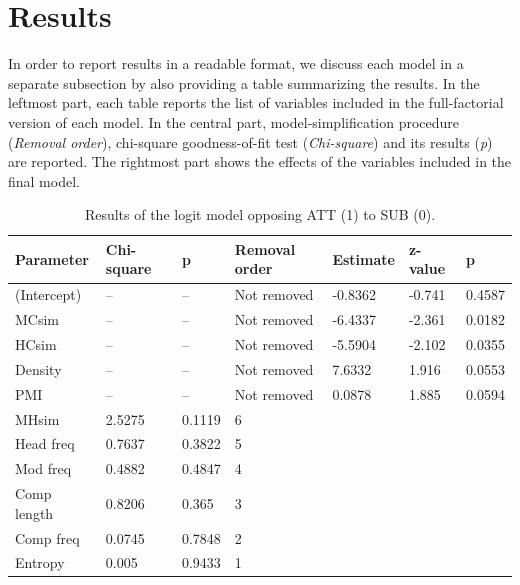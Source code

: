 \section{Results}
\label{sec:results}

In order to report results in a readable format, we discuss each model in a separate subsection by also providing a table summarizing the results. In the leftmost part, each table reports the list of variables included in the full-factorial version of each model. In the central part, model-simplification procedure (\emph{Removal order}), chi-square goodness-of-fit test (\emph{Chi-square}) and its results (\emph{p}) are reported. The rightmost part shows the effects of the variables included in the final model.

\begin{table}[t!]
\centering
\small
\begin{tabular}{|l|l|l|l|l|l|l|}
\hline
Parameter                    & Chi-square & p      & Removal order & Estimate & z-value & p      \\ \hline
(Intercept)                  & --       & --     & Not removed   & -0.8362  & -0.741  & 0.4587 \\
MCsim & --       & --     & Not removed   & -6.4337  & -2.361  & 0.0182 \\
HCsim     & --       & --     & Not removed   & -5.5904  & -2.102  & 0.0355 \\
Density         & --       & --     & Not removed   & 7.6332   & 1.916   & 0.0553 \\
PMI & --       & --     & Not removed   & 0.0878   & 1.885   & 0.0594 \\
MHsim     & 2.5275   & 0.1119 & 6             &          &         &        \\
Head freq               & 0.7637   & 0.3822 & 5             &          &         &        \\
Mod freq           & 0.4882   & 0.4847 & 4             &          &         &        \\
Comp length              & 0.8206   & 0.365  & 3             &          &         &        \\
Comp freq           & 0.0745   & 0.7848 & 2             &          &         &        \\
Entropy                      & 0.005    & 0.9433 & 1             &          &         &        \\ \hline
\end{tabular}
\caption{Results of the logit model opposing ATT (1) to SUB (0).}
\label{tab:resattsub}
\end{table}

